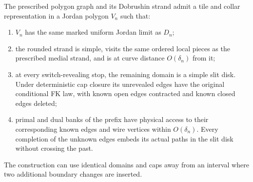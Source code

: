 \begin{lemma}\label{moving:drawing}
The prescribed polygon graph and its Dobrushin strand admit a tile
and collar representation in a Jordan polygon $V_n$ such that:
\begin{enumerate}[label=(\roman*)]
\item $V_n$ has the same marked uniform Jordan limit as $D_n$;
\item the rounded strand is simple, visits the same ordered local
pieces as the prescribed medial strand, and is at curve distance
$O(\delta_n)$ from it;
\item at every switch-revealing stop, the remaining domain is a simple
slit disk.  Under deterministic cap closure its unrevealed edges have
the original conditional FK law, with known open edges contracted
and known closed edges deleted;
\item primal and dual banks of the prefix have physical access to
their corresponding known edges and wire vertices within
$O(\delta_n)$.  Every completion of the unknown edges embeds its
actual paths in the slit disk without crossing the past.
\end{enumerate}
The construction can use identical domains and caps away from an
interval where two additional boundary changes are inserted.
\end{lemma}

